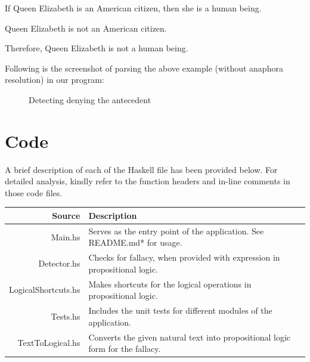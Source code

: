 \documentclass[14pt, english]{article}
\providecommand{\tabularnewline}{\\}
\begin{document}
\begin{center}
If Queen Elizabeth is an American citizen, then she is a human being.
\par\end{center}

\begin{center}
Queen Elizabeth is not an American citizen.
\par\end{center}

\begin{center}
Therefore, Queen Elizabeth is not a human being.
\par\end{center}

Following is the screenshot of parsing the above example (without anaphora
resolution) in our program:

\begin{figure}[htp]
 \caption{Detecting denying the antecedent} \end{figure}


\section{Code}

A brief description of each of the Haskell file has been provided
below. For detailed analysis, kindly refer to the function headers
and in-line comments in those code files. 
\medskip{}


\begin{tabular}{rl}
Source & Description\tabularnewline
\hline 
Main.hs & Serves as the entry point of the application. See README.md{*} for
usage.\tabularnewline
Detector.hs & Checks for fallacy, when provided with expression in propositional
logic.\tabularnewline
LogicalShortcuts.hs & Makes shortcuts for the logical operations in propositional logic.\tabularnewline
Tests.hs & Includes the unit tests for different modules of the application.\tabularnewline
TextToLogical.hs & Converts the given natural text into propositional logic form for
the fallacy.\tabularnewline
\end{tabular}
\end{document}
